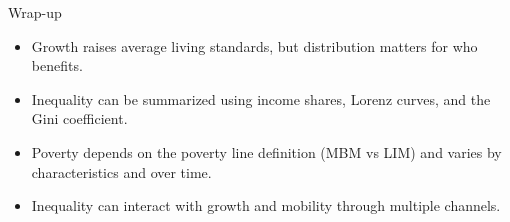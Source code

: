 \documentclass[aspectratio=169]{beamer}
\begin{document}
\begin{frame}{Wrap-up}
\transfade
\begin{itemize}
\item Growth raises average living standards, but distribution matters for who benefits.
\item Inequality can be summarized using income shares, Lorenz curves, and the Gini coefficient.
\item Poverty depends on the poverty line definition (MBM vs LIM) and varies by characteristics and over time.
\item Inequality can interact with growth and mobility through multiple channels.
\end{itemize}
\end{frame}
\end{document}
